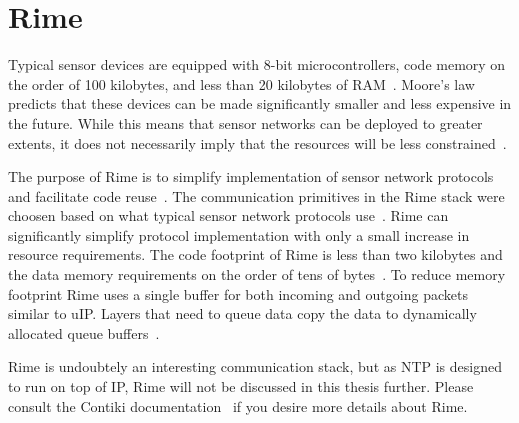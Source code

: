 
\section{Rime}\label{sec:contiki-rime}
Typical sensor devices are equipped with 8-bit microcontrollers,
code memory on the order of 100 kilobytes, and less than
20 kilobytes of RAM~\cite{paper-contiki}.
Moore's law predicts that these devices
can be made significantly smaller and less expensive
in the future. While this means that sensor networks can
be deployed to greater extents, it does not necessarily imply
that the resources will be less constrained~\cite{paper-contiki}.

The purpose of Rime is to simplify implementation of
sensor network protocols and facilitate code reuse~\cite{paper-rime}. 
The communication primitives in the Rime stack were choosen
based on what typical sensor network protocols use~\cite{contiki-docs}.
Rime can significantly simplify protocol implementation
with only a small increase in resource requirements.
The code footprint of Rime is less than two kilobytes and the
data memory requirements on the order of tens of bytes~\cite{paper-rime}.
To reduce memory footprint Rime uses a single buffer for
both incoming and outgoing packets similar to uIP. Layers
that need to queue data copy the data to dynamically
allocated queue buffers~\cite{paper-rime}.

Rime is undoubtely an interesting communication stack, but
as NTP is designed to run on top of IP, Rime will not be discussed
in this thesis further.
Please consult the Contiki documentation~\cite{contiki-docs} if you desire
more details about Rime.
